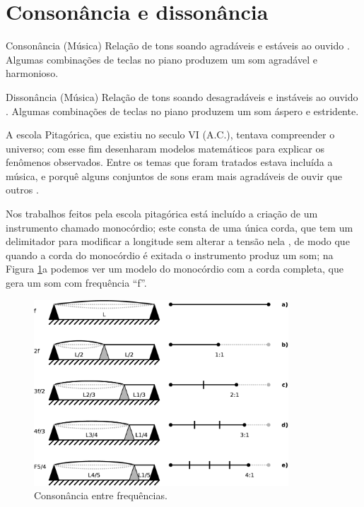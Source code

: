\section{Consonância e dissonância}
\label{sec:consonancia}

\begin{tcbinformation}{Consonância (Música)}
\label{ref:consonancia}
Relação de tons soando agradáveis e estáveis ao ouvido \cite[pp. 26]{wright2012essential}.
Algumas combinações de teclas no piano produzem um som agradável e harmonioso.
\end{tcbinformation} 


\begin{tcbinformation}{Dissonância (Música)}
\label{ref:dissonancia}
Relação de tons soando desagradáveis e instáveis ao ouvido \cite[pp. 26]{wright2012essential}.
Algumas combinações de teclas no piano produzem um som áspero e estridente.
\end{tcbinformation} 



A escola Pitagórica, que existiu no seculo VI (A.C.),
tentava compreender o universo;
com esse fim desenharam modelos matemáticos para explicar 
os fenômenos observados.
Entre os temas que foram tratados estava incluída a música,
e porquê alguns conjuntos de sons eram mais 
agradáveis de ouvir que outros \cite[pp. 11]{arbones2012armonia}.

Nos trabalhos feitos pela escola pitagórica
está incluído a criação de um instrumento chamado monocórdio;
este consta de uma única corda,
que tem um delimitador para modificar a longitude sem alterar a tensão nela \cite[pp. 12]{arbones2012armonia},
de modo que quando a corda do monocórdio é exitada o instrumento produz um som;
na Figura \ref{fig:consonancia}a podemos ver um modelo do monocórdio com a corda completa, 
que gera um som com frequência ``f''.
\begin{figure}[!h]
  \centering
    \includegraphics[width=0.85\textwidth]{chapters/cap-musica-composer/consonancia0.eps}
\caption{Consonância entre frequências.}
\label{fig:consonancia}
\end{figure}

